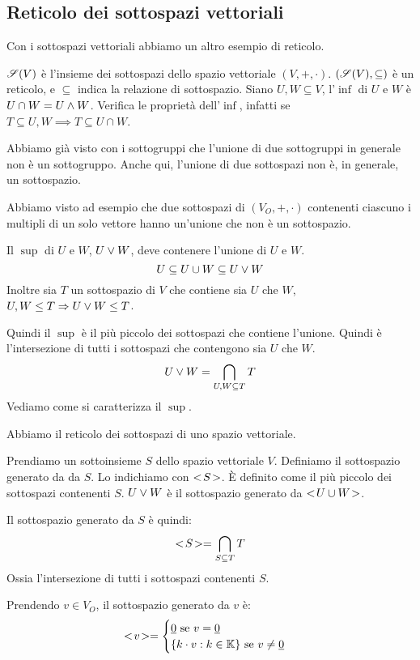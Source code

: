\subsection{Reticolo dei sottospazi vettoriali}

Con i sottospazi vettoriali abbiamo un altro esempio di reticolo.

$\mathscr{S}(V)$ \`e l'insieme dei sottospazi dello spazio vettoriale $(V, +, \cdot)$. $(\mathscr{S}(V), \subseteq)$ \`e un reticolo, e $\subseteq$ indica la relazione di sottospazio. Siano $U, W \subseteq V$, l'$\inf$ di $U$ e $W$ \`e $U \cap W = U \wedge W$. Verifica le propriet\`a dell'$\inf$, infatti se $T \subseteq U, W \implies T \subseteq U \cap W$.

Abbiamo gi\`a visto con i sottogruppi che l'unione di due sottogruppi in generale non \`e un sottogruppo. Anche qui, l'unione di due sottospazi non \`e, in generale, un sottospazio.

Abbiamo visto ad esempio che due sottospazi di $(V_O, +, \cdot)$ contenenti ciascuno i multipli di un solo vettore hanno un'unione che non \`e un sottospazio.

Il $\sup$ di $U$ e $W$, $U \vee W$, deve contenere l'unione di $U$ e $W$.
\[
U \subseteq U \cup W \subseteq U \vee W
\]
Inoltre sia $T$ un sottospazio di $V$ che contiene sia $U$ che $W$, $U, W \le T \Rightarrow U \vee W \le T$.

Quindi il $\sup$ \`e il pi\`u piccolo dei sottospazi che contiene l'unione. Quindi \`e l'intersezione di tutti i sottospazi che contengono sia $U$ che $W$.
\[
U \vee W = \bigcap_{U, W \subseteq T} T
\]
Vediamo come si caratterizza il $\sup$.

Abbiamo il reticolo dei sottospazi di uno spazio vettoriale.

Prendiamo un sottoinsieme $S$ dello spazio vettoriale $V$. Definiamo il sottospazio generato da da $S$. Lo indichiamo con $<\!{S}\!>$. \`E definito come il pi\`u piccolo dei sottospazi contenenti $S$. $U \vee W$ \`e il sottospazio generato da $<\!{U \cup W}\!>$.

Il sottospazio generato da $S$ \`e quindi:
\[
<\!{S}\!> = \bigcap_{S \subseteq T} T
\]
Ossia l'intersezione di tutti i sottospazi contenenti $S$.

Prendendo $v \in V_O$, il sottospazio generato da $v$ \`e:
\[
<\!{v}\!> = 
\begin{cases}
\underline{0} \text{ se } v = \underline{0} \\
\{ k \cdot v : k \in \mathbb{K} \} \text{ se } v \neq \underline{0}
\end{cases}
\]

